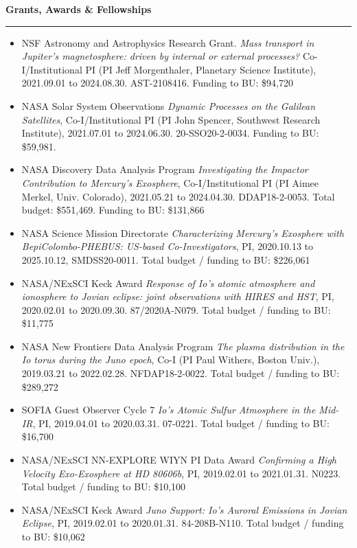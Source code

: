 \documentclass[12pt]{report}
\begin{document}
\noindent\bf{Grants, Awards \& Fellowships}\rm \hspace*{\fill} \\
\rule{\textwidth}{1pt}
\begin{itemize} \itemsep -2pt %
 \item NSF Astronomy and Astrophysics Research Grant. {\it Mass transport in Jupiter's magnetosphere: driven by internal or external processes?} Co-I/Institutional PI (PI Jeff Morgenthaler, Planetary Science Institute), 2021.09.01 to 2024.08.30. AST-2108416. Funding to BU: \$94,720
 \item NASA Solar System Observations {\it Dynamic Processes on the Galilean Satellites}, Co-I/Institutional PI (PI John Spencer, Southwest Research Institute), 2021.07.01 to 2024.06.30. 20-SSO20-2-0034. Funding to BU: \$59,981.
 \item NASA Discovery Data Analysis Program {\it Investigating the Impactor Contribution to Mercury's Exosphere}, Co-I/Institutional PI (PI Aimee Merkel, Univ. Colorado), 2021.05.21 to 2024.04.30. DDAP18-2-0053. Total budget: \$551,469. Funding to BU: \$131,866
 \item NASA Science Mission Directorate {\it Characterizing Mercury’s Exosphere with BepiColombo-PHEBUS: US-based Co-Investigators}, PI, 2020.10.13 to 2025.10.12, SMDSS20-0011. Total budget / funding to BU: \$226,061
 \item NASA/NExSCI Keck Award {\it Response of Io's atomic atmosphere and ionosphere to Jovian eclipse: joint observations with HIRES and HST}, PI, 2020.02.01 to 2020.09.30. 87/2020A-N079. Total budget / funding to BU: \$11,775
 \item NASA New Frontiers Data Analysis Program {\it The plasma distribution in the Io torus during the Juno epoch}, Co-I (PI Paul Withers, Boston Univ.), 2019.03.21 to 2022.02.28. NFDAP18-2-0022. Total budget / funding to BU: \$289,272
 \item SOFIA Guest Observer Cycle 7 {\it Io's Atomic Sulfur Atmosphere in the Mid-IR}, PI, 2019.04.01 to 2020.03.31. 07-0221. Total budget / funding to BU: \$16,700
 \item NASA/NExSCI NN-EXPLORE WIYN PI Data Award {\it Confirming a High Velocity Exo-Exosphere at HD 80606b}, PI, 2019.02.01 to 2021.01.31. N0223. Total budget / funding to BU: \$10,100
 \item NASA/NExSCI Keck Award {\it Juno Support: Io's Auroral Emissions in Jovian Eclipse}, PI, 2019.02.01 to 2020.01.31. 84-208B-N110. Total budget / funding to BU: \$10,062

\end{itemize}
\end{document}
